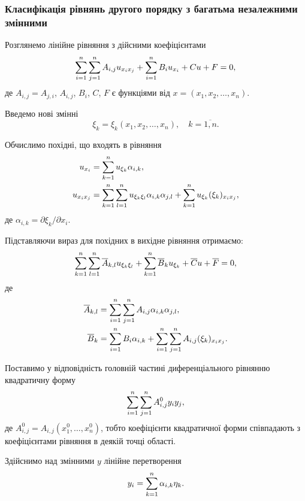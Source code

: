\subsubsection{Класифікація рівнянь другого порядку з багатьма незалежними змінними}

Розглянемо лінійне рівняння з дійсними коефіцієнтами
\begin{equation}
	\displaystyle\sum\limits_{i=1}^n \displaystyle\sum\limits_{j=1}^n A_{i,j} u_{x_i x_j} + \displaystyle\sum\limits_{i=1}^n B_i u_{x_i} + Cu + F = 0,
\end{equation}
де $A_{i,j} = A_{j,i}$, $A_{i,j}$, $B_i$, $C$, $F$ є функціями від $x = (x_1, x_2, \ldots, x_n)$. \medskip

Введемо нові змінні
\begin{equation}
	\xi_k = \xi_k(x_1, x_2, \ldots, x_n), \quad k = \overline{1, n}.
\end{equation}

Обчислимо похідні, що входять в рівняння
\begin{align}
	u_{x_i} &= \displaystyle\sum\limits_{k=1}^n u_{\xi_k} \alpha_{i,k}, \\
	u_{x_i x_j} &= \displaystyle\sum\limits_{k=1}^n \displaystyle\sum\limits_{l=1}^n u_{\xi_k\xi_l} \alpha_{i,k}\alpha_{j,l} + \displaystyle\sum\limits_{k=1}^n u_{\xi_k} (\xi_k)_{x_ix_j},
\end{align}
де $\alpha_{i,k}=\partial\xi_k/\partial x_i$. \medskip

Підставляючи вираз для похідних в вихідне рівняння отримаємо:
\begin{equation}
	\displaystyle\sum\limits_{k=1}^n \displaystyle\sum\limits_{l=1}^n \overline{A}_{k,l} u_{\xi_k\xi_l} + \displaystyle\sum\limits_{k=1}^n \overline{B}_k u_{\xi_k} + \overline{C} u + \overline{F} = 0,
\end{equation}
де
\begin{align}
	\label{eq:linear-coefficients-transform-a}
	\overline{A}_{k,l} &= \displaystyle\sum\limits_{i=1}^n \displaystyle\sum\limits_{j=1}^n A_{i,j}\alpha_{i,k}\alpha_{j,l}, \\
	\label{eq:linear-coefficients-transform-b}
	\overline{B}_k &= \displaystyle\sum\limits_{i=1}^n B_i \alpha_{i,k} + \displaystyle\sum\limits_{i=1}^n \displaystyle\sum\limits_{j=1}^n A_{i,j}(\xi_k)_{x_ix_j}.
\end{align}

Поставимо у відповідність головній частині диференціального рівнянню квадратичну форму
\begin{equation}
	\displaystyle\sum\limits_{i=1}^n \displaystyle\sum\limits_{j=1}^n A_{i,j}^0 y_iy_j,
\end{equation}
де $A_{i,j}^0=A_{i,j}(x_1^0,\ldots,x_n^0)$, тобто коефіцієнти квадратичної форми співпадають з коефіцієнтами рівняння в деякій точці області. \medskip

Здійснимо над змінними $y$ лінійне перетворення
\begin{equation}
	y_i = \displaystyle\sum\limits_{k=1}^n \alpha_{i,k} \eta_k.
\end{equation}

